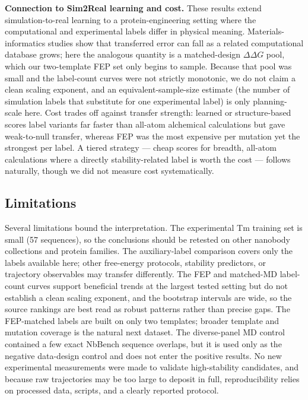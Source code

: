 \textbf{Connection to Sim2Real learning and cost.} These results extend
simulation-to-real learning \citep{Minami2025Scaling} to a protein-engineering
setting where the computational and experimental labels differ in physical meaning.
Materials-informatics studies show that transferred error can fall as a related
computational database grows; here the analogous quantity is a matched-design
$\Delta\Delta G$ pool, which our two-template FEP set only begins to sample. Because
that pool was small and the label-count curves were not strictly monotonic, we do
not claim a clean scaling exponent, and an equivalent-sample-size estimate (the
number of simulation labels that substitute for one experimental label) is only
planning-scale here. Cost trades off against transfer strength: learned or
structure-based scores label variants far faster than all-atom alchemical
calculations but gave weak-to-null transfer, whereas FEP was the most expensive per
mutation yet the strongest per label. A tiered strategy --- cheap scores for breadth,
all-atom calculations where a directly stability-related label is worth the cost ---
follows naturally, though we did not measure cost systematically.

\subsection*{Limitations}

Several limitations bound the interpretation. The experimental Tm training set is
small (57 sequences), so the conclusions should be retested on other nanobody
collections and protein families. The auxiliary-label comparison covers only the
labels available here; other free-energy protocols, stability predictors, or
trajectory observables may transfer differently. The FEP and matched-MD label-count
curves support beneficial trends at the largest tested setting but do not establish
a clean scaling exponent, and the bootstrap intervals are wide, so the source
rankings are best read as robust patterns rather than precise gaps. The
FEP-matched labels are built on only two templates; broader template and mutation
coverage is the natural next dataset. The diverse-panel MD control contained a few
exact NbBench sequence overlaps, but it is used only as the negative data-design
control and does not enter the positive results. No new experimental measurements
were made to validate high-stability candidates, and because raw trajectories may
be too large to deposit in full, reproducibility relies on processed data, scripts,
and a clearly reported protocol.
